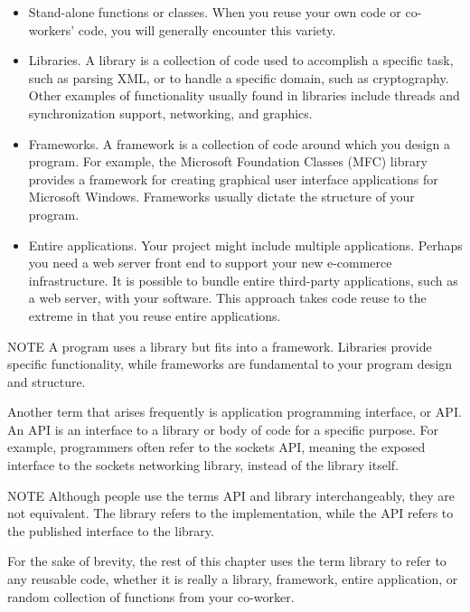 \begin{itemize}
\item
Stand-alone functions or classes. When you reuse your own code or co-workers’ code, you will generally encounter this variety.

\item
Libraries. A library is a collection of code used to accomplish a specific task, such as parsing XML, or to handle a specific domain, such as cryptography. Other examples of functionality usually found in libraries include threads and synchronization support, networking, and graphics.

\item
Frameworks. A framework is a collection of code around which you design a program. For example, the Microsoft Foundation Classes (MFC) library provides a framework for creating graphical user interface applications for Microsoft Windows. Frameworks usually dictate the structure of your program.

\item
Entire applications. Your project might include multiple applications. Perhaps you need a web server front end to support your new e-commerce infrastructure. It is possible to bundle entire third-party applications, such as a web server, with your software. This approach takes code reuse to the extreme in that you reuse entire applications.
\end{itemize}

\begin{myNotic}{NOTE}
A program uses a library but fits into a framework. Libraries provide specific functionality, while frameworks are fundamental to your program design and structure.
\end{myNotic}

Another term that arises frequently is application programming interface, or API. An API is an interface to a library or body of code for a specific purpose. For example, programmers often refer to the sockets API, meaning the exposed interface to the sockets networking library, instead of the library itself.

\begin{myNotic}{NOTE}
Although people use the terms API and library interchangeably, they are not equivalent. The library refers to the implementation, while the API refers to the published interface to the library.
\end{myNotic}

For the sake of brevity, the rest of this chapter uses the term library to refer to any reusable code, whether it is really a library, framework, entire application, or random collection of functions from your co-worker.

